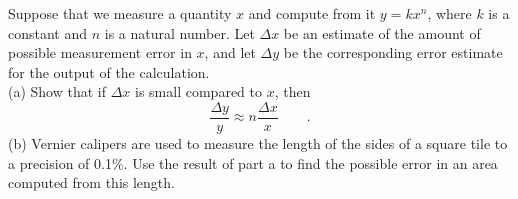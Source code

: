Suppose that we measure a quantity $x$ and compute from
it $y=kx^n$, where $k$ is a constant and $n$ is a natural
number. Let $\Delta x$ be an estimate of the amount of possible 
measurement error in $x$, and let $\Delta y$ be the corresponding
error estimate for the output of the calculation. \\
(a) Show that
if $\Delta x$ is small compared to $x$, then
\begin{equation*}
  \frac{\Delta y}{y} \approx n \frac{\Delta x}{x} \qquad .
\end{equation*}
(b) Vernier calipers are used to measure the length of the sides
of a square tile to a precision of 0.1\%.
Use the result of part a to find the possible
error in an area computed from this length.
